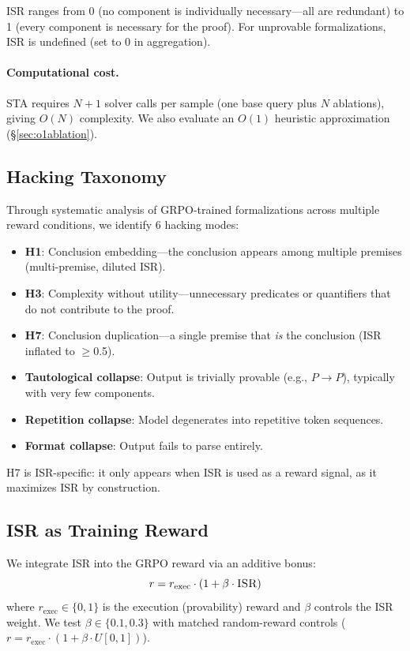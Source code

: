 \documentclass[11pt,a4paper]{article}
\newcommand{\ISR}{\textsc{ISR}}
\newcommand{\STA}{\textsc{STA}}
\newcommand{\GRPO}{\textsc{GRPO}}
\begin{document}
\ISR{} ranges from 0 (no component is individually necessary---all are redundant) to 1 (every component is necessary for the proof). For unprovable formalizations, \ISR{} is undefined (set to 0 in aggregation).

\paragraph{Computational cost.} \STA{} requires $N+1$ solver calls per sample (one base query plus $N$ ablations), giving $O(N)$ complexity. We also evaluate an $O(1)$ heuristic approximation (\S\ref{sec:o1ablation}).

\subsection{Hacking Taxonomy}

Through systematic analysis of \GRPO{}-trained formalizations across multiple reward conditions, we identify 6 hacking modes:

\begin{itemize}
\item \textbf{H1}: Conclusion embedding---the conclusion appears among multiple premises (multi-premise, diluted \ISR{}).
\item \textbf{H3}: Complexity without utility---unnecessary predicates or quantifiers that do not contribute to the proof.
\item \textbf{H7}: Conclusion duplication---a single premise that \emph{is} the conclusion (\ISR{} inflated to $\geq$0.5).
\item \textbf{Tautological collapse}: Output is trivially provable (e.g., $P \to P$), typically with very few components.
\item \textbf{Repetition collapse}: Model degenerates into repetitive token sequences.
\item \textbf{Format collapse}: Output fails to parse entirely.
\end{itemize}

H7 is ISR-specific: it only appears when \ISR{} is used as a reward signal, as it maximizes \ISR{} by construction.

\subsection{\ISR{} as Training Reward}

We integrate \ISR{} into the \GRPO{} reward via an additive bonus:
\begin{equation}
r = r_{\text{exec}} \cdot (1 + \beta \cdot \ISR{})
\end{equation}
where $r_{\text{exec}} \in \{0, 1\}$ is the execution (provability) reward and $\beta$ controls the \ISR{} weight. We test $\beta \in \{0.1, 0.3\}$ with matched random-reward controls ($r = r_{\text{exec}} \cdot (1 + \beta \cdot U[0,1])$).
\end{document}
